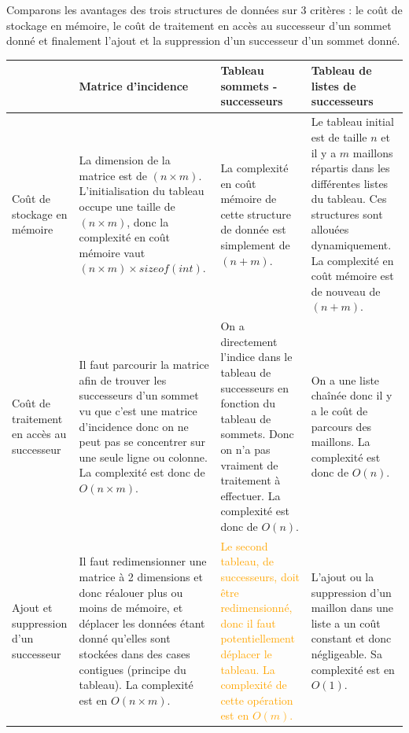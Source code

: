 \documentclass[11pt, a4paper]{report}
\begin{document}
    Comparons les avantages des trois structures de données sur 3 critères : le coût de stockage en mémoire, le coût de traitement en accès au successeur d'un sommet donné et finalement l'ajout et la suppression d'un successeur d'un sommet donné.
    
    \begin{center}
        \begin{tabular}{ | p{} | p{} | p{} | p{} | } 
            \hline
            	 &
            	Matrice d'incidence &
            	Tableau sommets - successeurs &
            	Tableau de listes de successeurs \\
            \hline
            	Coût de stockage en mémoire &
            	\textcolor{BrickRed}{La dimension de la matrice est de $(n \times m)$. L'initialisation du tableau occupe une taille de $(n \times m)$, donc la complexité en coût mémoire vaut $(n \times m) \times sizeof(int)$.} &
            	\textcolor{OliveGreen}{La complexité en coût mémoire de cette structure de donnée est simplement de $(n+m)$.} &
	            \textcolor{OliveGreen}{Le tableau initial est de taille $n$ et il y a $m$ maillons répartis dans les différentes listes du tableau. Ces structures sont allouées dynamiquement. La complexité en coût mémoire est de nouveau de $(n + m)$.}\\
            \hline
            	Coût de traitement en accès au successeur &
            	\textcolor{BrickRed}{Il faut parcourir la matrice afin de trouver les successeurs d'un sommet vu que c'est une matrice d'incidence donc on ne peut pas se concentrer sur une seule ligne ou colonne. La complexité est donc de\hspace{1cm} $O(n \times m)$.} &
            	\textcolor{OliveGreen}{On a directement l'indice dans le tableau de successeurs en fonction du tableau de sommets. Donc on n'a pas vraiment de traitement à effectuer. La complexité est donc de $O(n)$.} &
            	\textcolor{OliveGreen}{On a une liste chaînée donc il y a le coût de parcours des maillons. La complexité est donc de $O(n)$.}\\
            \hline
            	Ajout et suppression d'un successeur &
            	\textcolor{BrickRed}{Il faut redimensionner une matrice à 2 dimensions et donc réalouer plus ou moins de mémoire, et déplacer les données étant donné qu'elles sont stockées dans des cases contigues (principe du tableau). La complexité est en $O(n \times m)$.} &
            	\textcolor{Orange}{Le second tableau, de successeurs, doit être redimensionné, donc il faut potentiellement déplacer le tableau. La complexité de cette opération est en $O(m)$.} &
            	\textcolor{OliveGreen}{L'ajout ou la suppression d'un maillon dans une liste a un coût constant et donc négligeable. Sa complexité est en $O(1)$.}\\
            \hline
        \end{tabular}
    \end{center}
\end{document}
